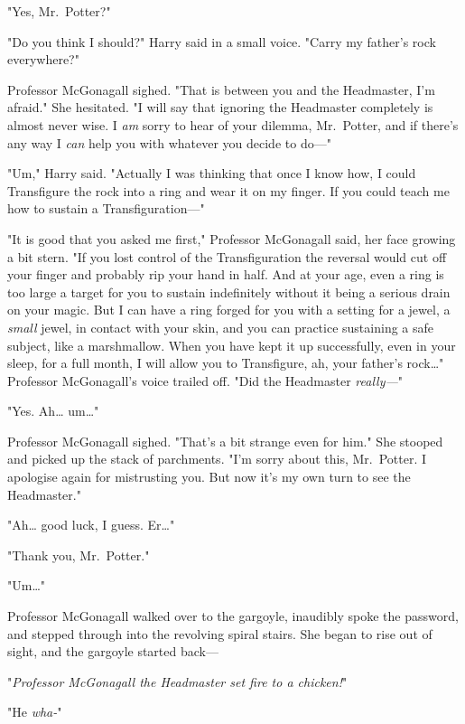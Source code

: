 "Yes, Mr.~Potter?"

"Do you think I should?" Harry said in a small voice. "Carry my father's rock 
everywhere?"

Professor McGonagall sighed. "That is between you and the Headmaster, I'm 
afraid." She hesitated. "I will say that ignoring the Headmaster completely is 
almost never wise. I \emph{am} sorry to hear of your dilemma, Mr.~Potter, and 
if there's any way I \emph{can} help you with whatever you decide to do---"

"Um," Harry said. "Actually I was thinking that once I know how, I could 
Transfigure the rock into a ring and wear it on my finger. If you could teach 
me how to sustain a Transfiguration---"

"It is good that you asked me first," Professor McGonagall said, her face 
growing a bit stern. "If you lost control of the Transfiguration the reversal 
would cut off your finger and probably rip your hand in half. And at your age, 
even a ring is too large a target for you to sustain indefinitely without it 
being a serious drain on your magic. But I can have a ring forged for you with 
a setting for a jewel, a \emph{small} jewel, in contact with your skin, and you 
can practice sustaining a safe subject, like a marshmallow. When you have kept 
it up successfully, even in your sleep, for a full month, I will allow you to 
Transfigure, ah, your father's rock{\ldots}" Professor McGonagall's voice 
trailed off. "Did the Headmaster \emph{really---}"

"Yes. Ah{\ldots} um{\ldots}"

Professor McGonagall sighed. "That's a bit strange even for him." She stooped 
and picked up the stack of parchments. "I'm sorry about this, Mr.~Potter. I 
apologise again for mistrusting you. But now it's my own turn to see the 
Headmaster."

"Ah{\ldots} good luck, I guess. Er{\ldots}"

"Thank you, Mr.~Potter."

"Um{\ldots}"

Professor McGonagall walked over to the gargoyle, inaudibly spoke the password, 
and stepped through into the revolving spiral stairs. She began to rise out of 
sight, and the gargoyle started back---

"\emph{Professor McGonagall the Headmaster set fire to a chicken!}"

"He \emph{wha-}"